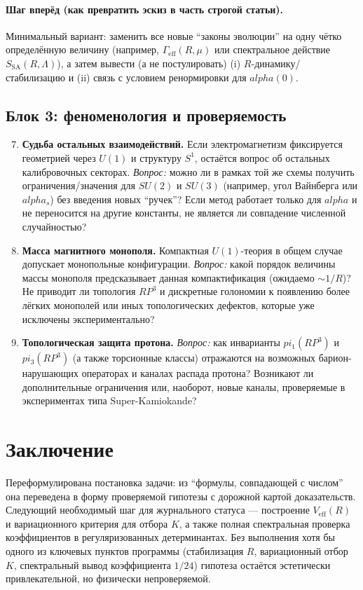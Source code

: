 \documentclass[12pt]{article}
\def\mathbb#1{#1}%
\def\alpha{alpha}%
\def\pi{pi}%
\begin{document}
\paragraph{Шаг вперёд (как превратить эскиз в часть строгой статьи).}
Минимальный вариант: заменить все новые ``законы эволюции'' на одну чётко определённую величину (например, $\Gamma_{\mathrm{eff}}(R,\mu)$ или спектральное действие $S_{\mathrm{SA}}(R,\Lambda)$), а затем вывести (а не постулировать) (i) $R$-динамику/стабилизацию и (ii) связь с условием ренормировки для $\alpha(0)$.

\subsection{Блок 3: феноменология и проверяемость}
\begin{enumerate}
  \setcounter{enumi}{6}
  \item \textbf{Судьба остальных взаимодействий.}
  Если электромагнетизм фиксируется геометрией через $U(1)$ и структуру $S^1$, остаётся вопрос об остальных калибровочных секторах.
  \emph{Вопрос:} можно ли в рамках той же схемы получить ограничения/значения для $SU(2)$ и $SU(3)$ (например, угол Вайнберга или $\alpha_s$) без введения новых ``ручек''? Если метод работает только для $\alpha$ и не переносится на другие константы, не является ли совпадение численной случайностью?

  \item \textbf{Масса магнитного монополя.}
  Компактная $U(1)$-теория в общем случае допускает монопольные конфигурации.
  \emph{Вопрос:} какой порядок величины массы монополя предсказывает данная компактификация (ожидаемо $\sim 1/R$)? Не приводит ли топология $\mathbb{RP}^3$ и дискретные голономии к появлению более лёгких монополей или иных топологических дефектов, которые уже исключены экспериментально?

  \item \textbf{Топологическая защита протона.}
  \emph{Вопрос:} как инварианты $\pi_1(\mathbb{RP}^3)$ и $\pi_3(\mathbb{RP}^3)$ (а также торсионные классы) отражаются на возможных барион-нарушающих операторах и каналах распада протона? Возникают ли дополнительные ограничения или, наоборот, новые каналы, проверяемые в экспериментах типа Super-Kamiokande?
\end{enumerate}

\section{Заключение}
Переформулирована постановка задачи: из ``формулы, совпадающей с числом'' она переведена в форму проверяемой гипотезы с дорожной картой доказательств.
Следующий необходимый шаг для журнального статуса --- построение $V_{\mathrm{eff}}(R)$ и вариационного критерия для отбора $K$, а также полная спектральная проверка коэффициентов в регуляризованных детерминантах.
Без выполнения хотя бы одного из ключевых пунктов программы (стабилизация $R$, вариационный отбор $K$, спектральный вывод коэффициента $1/24$) гипотеза остаётся эстетически привлекательной, но физически непроверяемой.
\end{document}
